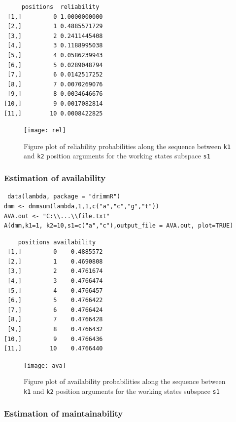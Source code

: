 \documentclass[article,nojss]{jss}\usepackage[]{graphicx}\usepackage[]{color}
\begin{document}
\begin{lstlisting}
     positions  reliability
 [1,]         0 1.0000000000
 [2,]         1 0.4885571729
 [3,]         2 0.2411445408
 [4,]         3 0.1188995038
 [5,]         4 0.0586239943
 [6,]         5 0.0289048794
 [7,]         6 0.0142517252
 [8,]         7 0.0070269076
 [9,]         8 0.0034646676
[10,]         9 0.0017082814
[11,]        10 0.0008422825
\end{lstlisting}


\begin{figure}[htbp]
\centering
\texttt{[image: rel]}
\caption{Figure plot of reliability probabilities along the sequence between {\tt k1} and {\tt k2} position arguments for the working states subspace  {\tt s1} }
\end{figure}

\clearpage

\subsubsection{Estimation of availability} \label{subsection_pack_avail}


\begin{lstlisting}
 data(lambda, package = "drimmR")
dmm <- dmmsum(lambda,1,1,c("a","c","g","t"))
AVA.out <- "C:\\...\\file.txt"
A(dmm,k1=1, k2=10,s1=c("a","c"),output_file = AVA.out, plot=TRUE)
\end{lstlisting}

\begin{lstlisting}
    positions availability
 [1,]         0    0.4885572
 [2,]         1    0.4690808
 [3,]         2    0.4761674
 [4,]         3    0.4766474
 [5,]         4    0.4766457
 [6,]         5    0.4766422
 [7,]         6    0.4766424
 [8,]         7    0.4766428
 [9,]         8    0.4766432
[10,]         9    0.4766436
[11,]        10    0.4766440
\end{lstlisting}

\begin{figure}[htbp]
\centering
\texttt{[image: ava]}
\caption{Figure plot of availability probabilities along the sequence between {\tt k1} and {\tt k2} position arguments for the working states subspace  {\tt s1} }
\end{figure}

\clearpage


\subsubsection{Estimation of maintainability} \label{subsection_pack_maintain}
\end{document}

